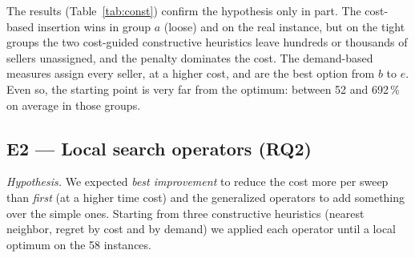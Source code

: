 \documentclass[11pt,a4paper]{article}
\begin{document}
\begin{table}[ht]
\centering
\caption{E1: mean true gap (\%) and total unassigned sellers of each constructive heuristic, by
group. NN: nearest neighbor; the other three are the regret insertion with $f_{ij}=c_{ij}$ (cost),
$d_{ij}$ (demand) and $d_{ij}/b_i$ (relative demand).}
\label{tab:const}
\small
{}
\end{table}

The results (Table~\ref{tab:const}) confirm the hypothesis only in part. The cost-based insertion
wins in group $a$ (loose) and on the real instance, but on the tight groups the two cost-guided
constructive heuristics leave hundreds or thousands of sellers unassigned, and the penalty
dominates the cost. The demand-based measures assign every seller, at a higher cost, and are the
best option from $b$ to $e$. Even so, the starting point is very far from the optimum: between 52
and 692\,\% on average in those groups.

\subsection{E2 --- Local search operators (RQ2)}
\emph{Hypothesis.} We expected \emph{best improvement} to reduce the cost more per sweep than
\emph{first} (at a higher time cost) and the generalized operators to add something over the simple
ones. Starting from three constructive heuristics (nearest neighbor, regret by cost and by demand)
we applied each operator until a local optimum on the 58 instances.
\end{document}
